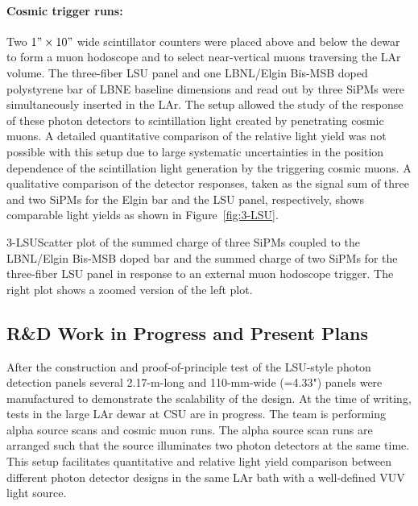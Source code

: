 \paragraph{Cosmic trigger runs:} Two $ 1" \times 10"$ wide scintillator counters were placed above and below the dewar to form a muon hodoscope and to select near-vertical muons traversing the LAr volume. The three-fiber LSU panel and one LBNL/Elgin Bis-MSB doped polystyrene bar of LBNE baseline dimensions and read out by three SiPMs were simultaneously inserted in the LAr. The setup allowed the study of the response of these photon detectors to scintillation light created by penetrating cosmic muons. A detailed quantitative comparison of the relative light yield was not possible with this setup due to large systematic uncertainties in the position dependence of the scintillation light generation by the triggering cosmic muons. A qualitative comparison of the detector responses, taken as the signal sum of three and two SiPMs for the Elgin bar and the LSU panel, respectively, shows comparable light yields as shown in Figure~\ref{fig:3-LSU}. 
        
%
%
\begin{cdrfigure}{3-LSU}{Scatter plot of the summed charge of three SiPMs coupled to the
 LBNL/Elgin Bis-MSB doped bar and the summed charge of two SiPMs for
 the three-fiber LSU panel in response to an external muon hodoscope
 trigger. The right plot shows a zoomed version of the left plot.}
\end{cdrfigure}

%

\subsection{R\&D Work in Progress and Present Plans }

After the construction and proof-of-principle test of the LSU-style
photon detection panels %
several 2.17-m-long and 110-mm-wide 
(=4.33") panels were manufactured to demonstrate the scalability of the design.  At
the time of writing, tests in the large LAr dewar at CSU are in
progress.  The team is performing alpha source scans and cosmic muon runs.
The alpha source scan runs are arranged such that the source
illuminates two photon detectors at the same time.  This setup
facilitates quantitative and relative light yield comparison between
different photon detector designs in the same LAr bath with a well-defined VUV light source.

